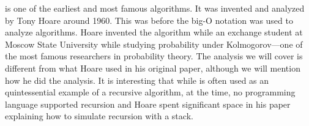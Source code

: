 {%






\begin{remark}
\Qsort{} is one of the earliest and most famous algorithms. It was
invented and analyzed by Tony Hoare around 1960.  This was before the
big-O notation was used to analyze algorithms.  Hoare invented the
algorithm while an exchange student at Moscow State University while
studying probability under Kolmogorov---one of the most famous
researchers in probability theory.  The analysis we will cover is
different from what Hoare used in his original paper, although we will
mention how he did the analysis.  It is interesting that while
\Qsort{} is often used as an quintessential example of a recursive
algorithm, at the time, no programming language supported recursion
and Hoare spent significant space in his paper explaining how to
simulate recursion with a stack.


\end{remark}}
